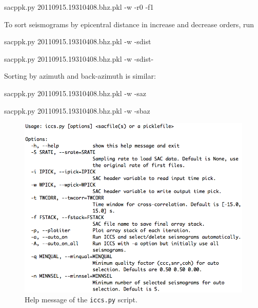 \documentclass[12pt, titlepage]{article}
\newenvironment{lyxcode}
{\begin{list}{}{
\setlength{\rightmargin}{\leftmargin}
\setlength{\listparindent}{0pt}%
\raggedright
\setlength{\itemsep}{0pt}
\setlength{\parsep}{0pt}
\normalfont\ttfamily}%
 \item[]}
{\end{list}}
\begin{document}
\begin{lyxcode}
sacppk.py 20110915.19310408.bhz.pkl -w -r0 -f1
\end{lyxcode}

To sort seismograms by epicentral distance in increase and decrease orders, run

\begin{lyxcode}
sacppk.py 20110915.19310408.bhz.pkl -w -sdist

sacppk.py 20110915.19310408.bhz.pkl -w -sdist-
\end{lyxcode}

Sorting by azimuth and back-azimuth is similar:
\begin{lyxcode}
sacppk.py 20110915.19310408.bhz.pkl -w -saz

sacppk.py 20110915.19310408.bhz.pkl -w -sbaz
\end{lyxcode}






\begin{figure}[!b]
    \centering
    \vspace{2em}
    \includegraphics[width = 0.94 \textwidth]{figs/help-iccs.png}
    \caption{Help message of the \texttt{iccs.py} script. }
    \label{fig:help-iccs}
\end{figure}
\end{document}
